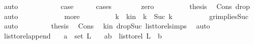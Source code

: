 \begin{isabellebody}
\ auto\ \ \ \ \isanewline
\ \ \ \ \isamarkupfalse%
\ \isamarkupfalse%
\ {\isacharquery}{\kern0pt}case\ \isanewline
\ \ \ \ \isamarkupfalse%
{\isacharparenleft}{\kern0pt}cases{\isacharparenright}{\kern0pt}\isanewline
\ \ \ \ \ \ \isamarkupfalse%
\ zero\isanewline
\ \ \ \ \ \ \isamarkupfalse%
\ \isamarkupfalse%
\ {\isacharquery}{\kern0pt}thesis\ \isamarkupfalse%
\ Cons\ drop{\isacharunderscore}{\kern0pt}{}\ \isamarkupfalse%
\ auto\isanewline
\ \ \ \ \isamarkupfalse%
\isanewline
\ \ \ \ \ \ \isamarkupfalse%
\ more\isanewline
\ \ \ \ \ \ \isamarkupfalse%
\ \isamarkupfalse%
\ k{}\ \ k{}{\isacharunderscore}{\kern0pt}in{\isacharcolon}{\kern0pt}\ \ {\isachardoublequoteopen}k\ {\isacharequal}{\kern0pt}\ Suc\ k{}{\isachardoublequoteclose}\isanewline
\ \ \ \ \ \ \ \ \isamarkupfalse%
\ gr{}{\isacharunderscore}{\kern0pt}implies{\isacharunderscore}{\kern0pt}Suc\ \isamarkupfalse%
\ auto\ \isanewline
\ \ \ \ \ \ \isamarkupfalse%
\ {\isacharquery}{\kern0pt}thesis\ \isamarkupfalse%
\ Cons\ \isamarkupfalse%
\ k{}{\isacharunderscore}{\kern0pt}in\ drop{\isacharunderscore}{\kern0pt}Suc\ list{\isacharunderscore}{\kern0pt}to{\isacharunderscore}{\kern0pt}rel{\isachardot}{\kern0pt}simps{\isacharparenleft}{\kern0pt}{}{\isacharparenright}{\kern0pt}\ \isamarkupfalse%
\ auto\isanewline
\ \ \ \ \isamarkupfalse%
\isanewline
\ \ \isamarkupfalse%
\isanewline
{}\isamarkupfalse%
%
\endisatagproof
{\isafoldproof}%
%
\isadelimproof
\isanewline
%
\endisadelimproof
\isanewline
{}\isamarkupfalse%
\ list{\isacharunderscore}{\kern0pt}to{\isacharunderscore}{\kern0pt}rel{\isacharunderscore}{\kern0pt}append{\isacharcolon}{\kern0pt}\isanewline
\ \ \ {\isachardoublequoteopen}a\ {\isasymin}\ set\ L{\isachardoublequoteclose}\isanewline
\ \ \ {\isachardoublequoteopen}{\isacharparenleft}{\kern0pt}a{\isacharcomma}{\kern0pt}b{\isacharparenright}{\kern0pt}\ {\isasymin}\ list{\isacharunderscore}{\kern0pt}to{\isacharunderscore}{\kern0pt}rel\ {\isacharparenleft}{\kern0pt}L\ {\isacharat}{\kern0pt}\ {\isacharbrackleft}{\kern0pt}b{\isacharbrackright}{\kern0pt}{\isacharparenright}{\kern0pt}{\isachardoublequoteclose}\ \isanewline

\end{isabellebody}
